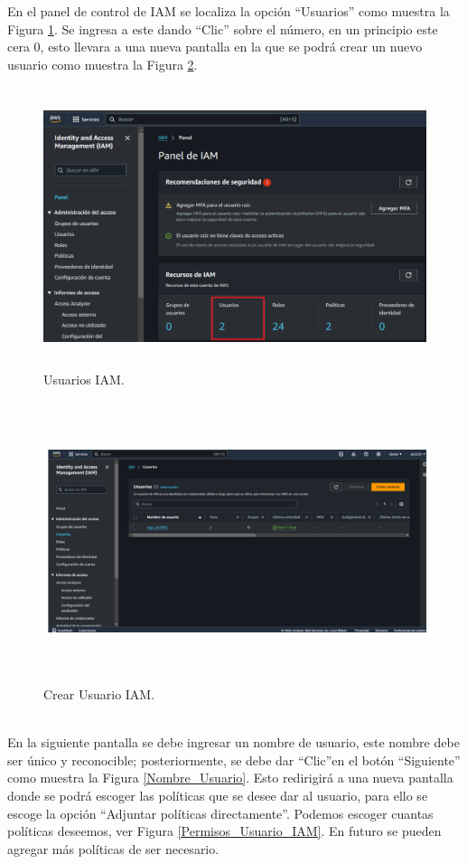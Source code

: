 \documentclass[a4paper,10pt, oneside, titlepage]{article}
\begin{document}
	\indent En el panel de control de IAM se localiza la opción ``Usuarios'' como muestra la Figura \ref{Usuarios_IAM}. Se ingresa a este dando ``Clic'' sobre el número, en un principio este cera 0, esto llevara a una nueva pantalla en la que se podrá crear un nuevo usuario como muestra la Figura \ref{Crear_Usuario_IAM}.
	\begin{figure}[!h]
		\centering
		\includegraphics[width = 1\linewidth, height = 8.2cm]{Usuarios_IAM.png}
		\caption{Usuarios IAM.}
		\label{Usuarios_IAM}
	\end{figure}
	\begin{figure}[!h]
		\centering
		\includegraphics[width = 1\linewidth, height = 8.2cm]{Crear_Usuario_IAM.png}
		\caption{Crear Usuario IAM.}
		\label{Crear_Usuario_IAM}
	\end{figure} \\
	\indent En la siguiente pantalla se debe ingresar un nombre de usuario, este nombre debe ser único y reconocible; posteriormente, se debe dar ``Clic''en el botón ``Siguiente'' como muestra la Figura \ref{Nombre_Usuario}. Esto redirigirá a una nueva pantalla donde se podrá escoger las políticas que se desee dar al usuario, para ello se escoge la opción ``Adjuntar políticas directamente''. Podemos escoger cuantas políticas deseemos, ver Figura \ref{Permisos_Usuario_IAM}. En futuro se pueden agregar más políticas de ser necesario.
\end{document}
